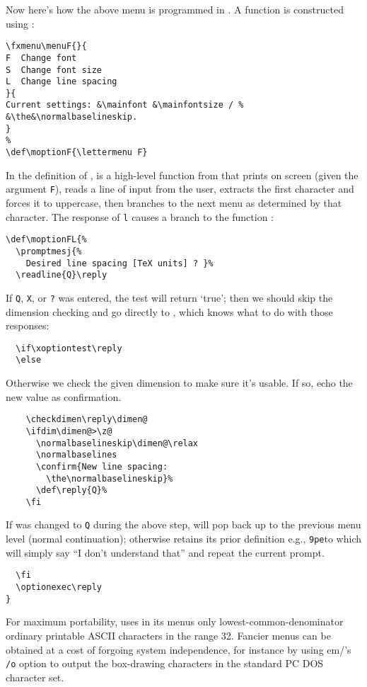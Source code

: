 \begin{multicols}{2}
{Now here's how the above menu is programmed in .
A function  is constructed using :
\begin{verbatim}
\fxmenu\menuF{}{
F  Change font
S  Change font size
L  Change line spacing
}{
Current settings: &\mainfont &\mainfontsize / %
&\the&\normalbaselineskip.
}
%
\def\moptionF{\lettermenu F}
\end{verbatim}
In the definition of ,  is a high-level
function from  that prints  on screen (given
the argument \verb'F'), reads a line of input from the user, extracts
the first character and forces it to uppercase, then branches to
the next menu as determined by that character. The response of
\verb'l' causes a branch to the function :
\begin{verbatim}
\def\moptionFL{%
  \promptmesj{%
    Desired line spacing [TeX units] ? }%
  \readline{Q}\reply
\end{verbatim}
If \verb'Q', \verb'X', or \verb'?' was entered, the test
 will return `true'; then we should skip the dimension
checking and go directly to , which knows what to do
with those responses:
\begin{verbatim}
  \if\xoptiontest\reply
  \else
\end{verbatim}
Otherwise we check the given dimension to make sure it's usable. If so,
echo the new value as confirmation.
\begin{verbatim}
    \checkdimen\reply\dimen@
    \ifdim\dimen@>\z@
      \normalbaselineskip\dimen@\relax
      \normalbaselines
      \confirm{New line spacing:
        \the\normalbaselineskip}%
      \def\reply{Q}%
    \fi
\end{verbatim}
If  was changed to \verb'Q' during the above step,
 will pop back up to the previous menu level (normal
continuation); otherwise  retains its prior definition\Dash
e.g., \verb'9pe'\Dash to which  will simply say ``I
don't understand that'' and repeat the current prompt.
\begin{verbatim}
  \fi
  \optionexec\reply
}
\end{verbatim}

For maximum portability,  uses in its menus only
lowest-common-denominator ordinary printable ASCII characters in the
range 32. Fancier menus can be obtained at a cost of forgoing
system independence, for instance by using em\tex/'s \verb'/o' option
to output the box-drawing characters in the standard PC DOS character
set.
\fi

}
\end{multicols}
